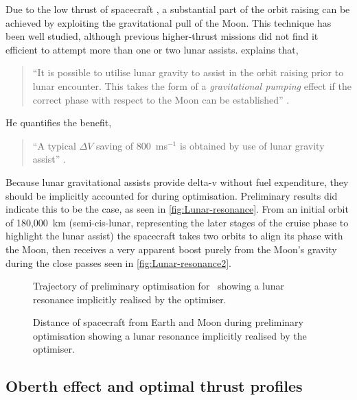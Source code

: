 Due to the low thrust of spacecraft \BW, a substantial part of the orbit raising can be achieved by exploiting the gravitational pull of the Moon. This technique has been well studied, although previous higher-thrust missions did not find it efficient to attempt more than one or two lunar assists. \textcite{Kemble2006} explains that,
\begin{quotation}
\enquote{It is possible to utilise lunar gravity to assist in the orbit raising prior to lunar encounter. This takes the form of a \emph{gravitational pumping} effect if the correct phase with respect to the Moon can be established} \parencite[p.249]{Kemble2006}. 
\end{quotation}
He quantifies the benefit,
\begin{quotation}
\enquote{A typical $\Delta V$ saving of 800~ms$^{-1}$ is obtained by use of lunar gravity assist} \parencite[p.248]{Kemble2006}.
\end{quotation}

Because lunar gravitational assists provide delta-v without fuel expenditure, they should be implicitly accounted for during optimisation. Preliminary results did indicate this to be the case, as seen in \autoref{fig:Lunar-resonance}. From an initial orbit of 180,000~km (semi-cis-lunar, representing the later stages of the cruise phase to highlight the lunar assist) the spacecraft takes two orbits to align its phase with the Moon, then receives a very apparent boost purely from the Moon's gravity during the close passes seen in \autoref{fig:Lunar-resonance2}.

\begin{figure}
\centering
\def\svgwidth{\figurewidth}

\caption{Trajectory of preliminary optimisation for \BW\ showing a lunar resonance implicitly realised by the optimiser.} \label{fig:Lunar-resonance}
\end{figure}

\begin{figure}
\centering
\def\svgwidth{\figurewidth}

\caption{Distance of spacecraft from Earth and Moon during preliminary optimisation showing a lunar resonance implicitly realised by the optimiser.} \label{fig:Lunar-resonance2}
\end{figure}




\subsection{Oberth effect and optimal thrust profiles} \label{sub:Oberth}

